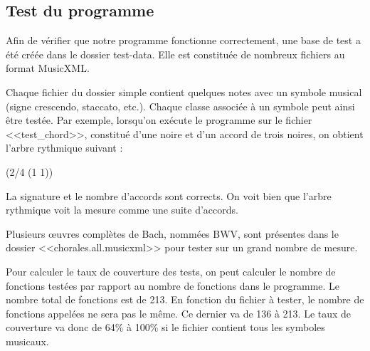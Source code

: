 \subsection{Test du programme}

Afin de vérifier que notre programme fonctionne correctement, une base de test a été créée dans le dossier test-data. Elle est constituée de nombreux fichiers au format MusicXML.

Chaque fichier du dossier simple contient quelques notes avec un symbole musical (signe crescendo, staccato, etc.). Chaque classe associée à un symbole peut ainsi être testée. Par exemple, lorsqu’on exécute le programme sur le fichier {<<test\_chord>>}, constitué d’une noire et d’un accord de trois noires, on obtient l’arbre rythmique suivant : 

\begin{center}
(2/4 (1 1))
\end{center}

La signature et le nombre d’accords sont corrects. On voit bien que l’arbre rythmique voit la mesure comme une suite d’accords. 

Plusieurs œuvres complètes de Bach, nommées BWV, sont présentes dans le dossier {<<chorales.all.musicxml>>} pour tester sur un grand nombre de mesure. 

Pour calculer le taux de couverture des tests, on peut calculer le nombre de fonctions testées par rapport au nombre de fonctions dans le programme. Le nombre total de fonctions est de 213. En fonction du fichier à tester, le nombre de fonctions appelées ne sera pas le même. Ce dernier va de 136 à 213. Le taux de couverture va donc de 64\% à 100\% si le fichier contient tous les symboles musicaux.
